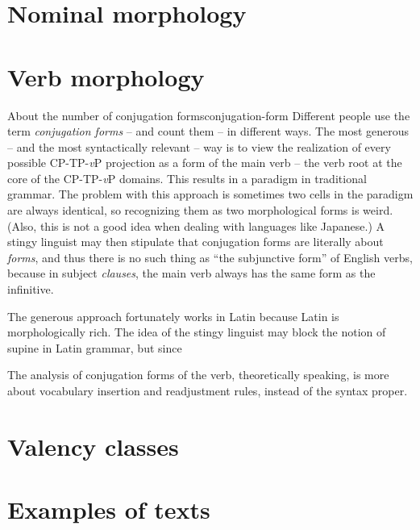 \documentclass[UTF8, a4paper, oneside, scheme=plain]{ctexrep}
\newcommand*{\term}[1]{\emph{#1}}
\newcommand{\vP}{\textit{v}P}
\begin{document}
\chapter{Nominal morphology}

\chapter{Verb morphology}

\begin{theorybox}{About the number of conjugation forms}{conjugation-form}
    Different people use the term \term{conjugation forms} -- and count them -- in different ways.
    The most generous -- and the most syntactically relevant -- way 
    is to view the realization of every possible CP-TP-\vP{} projection 
    as a form of the main verb -- the verb root at the core of the CP-TP-\vP{} domains.
    This results in a paradigm in traditional grammar.
    The problem with this approach is sometimes two cells in the paradigm are always identical,
    so recognizing them as two morphological forms is weird.
    (Also, this is not a good idea when dealing with languages like Japanese.)
    A stingy linguist may then stipulate that conjugation forms are literally about \emph{forms},
    and thus there is no such thing as ``the subjunctive form'' of English verbs,
    because in subject \emph{clauses}, 
    the main verb always has the same form as the infinitive.

    The generous approach fortunately works in Latin 
    because Latin is morphologically rich.
    The idea of the stingy linguist may block the notion of supine in Latin grammar,
    but since 

    The analysis of conjugation forms of the verb, theoretically speaking,
    is more about vocabulary insertion and readjustment rules,
    instead of the syntax proper.
\end{theorybox}

\chapter{Valency classes}

\chapter{Examples of texts}



\end{document}

